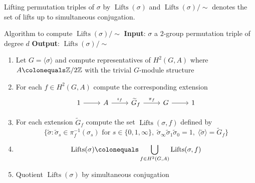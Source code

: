\documentclass[xcolor=dvipsnames]{beamer}
\theoremstyle{plain}
\newcommand{\ZZ}{\mathbb Z}
\newcommand{\wt}[1]{\widetilde{#1}}
\DeclareMathOperator{\Lifts}{Lifts}
\begin{document}
{\begin{frame}[fragile]{Lifting permutation triples}
      of $\sigma$ by $\Lifts(\sigma)$
      and $\Lifts(\sigma)/\!\!\sim$
      denotes the set of lifts up
      to simultaneous conjugation.
    \end{frame}
    \begin{frame}[fragile]{Algorithm to compute $\Lifts(\sigma)/\!\!\sim$}
      \textbf{Input}:
      $\sigma$ a $2$-group permutation triple of degree $d$
      \newline
      \textbf{Output}:
      $\Lifts(\sigma)/\!\!\sim$
      \pause\par
      \begin{enumerate}
        \item
          Let $G = \langle\sigma\rangle$
          and compute representatives
          of $H^2(G,A)$
          where $A\colonequals\ZZ/2\ZZ$
          with the trivial $G$-module structure
        \item\pause
          For each $f\in H^2(G,A)$
          compute the corresponding
          extension
          \[
            \begin{tikzcd}
              1\arrow{r}&A\arrow{r}{\iota_f}
                        &\wt{G}_f\arrow{r}{\pi_f}
                        &G\arrow{r}&1
            \end{tikzcd}
          \]
        \item\pause
          For each extension
          $\wt{G}_f$
          compute the set
          $\Lifts(\sigma,f)$ defined by
          \[
            \Big\{
              \wt{\sigma}
              :
              \wt{\sigma}_s\in\pi_f^{-1}
              (\sigma_s)\text{ for }
              s\in\{0,1,\infty\},\;
              \wt{\sigma}_\infty
              \wt{\sigma}_1
              \wt{\sigma}_0=1,\;
              \langle\wt{\sigma}\rangle
              =\wt{G}_f
            \Big\}
          \]
        \item\pause
          \[
            \Lifts(\sigma)
            \colonequals
            \bigcup_{f\in H^2(G,A)}
            \Lifts(\sigma, f)
          \]
        \item\pause
          Quotient $\Lifts(\sigma)$
          by simultaneous conjugation

\end{enumerate}
\end{frame}}
\end{document}
